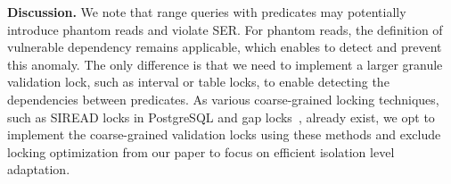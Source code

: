 \noindent\textbf{Discussion.} 
We note that range queries with predicates may potentially introduce phantom reads and violate SER. 
For phantom reads, the definition of vulnerable dependency remains applicable, which enables \sysname to detect and prevent this anomaly. 
The only difference is that we need to implement a larger granule validation lock, such as interval or table locks, to enable detecting the dependencies between predicates. 
As various coarse-grained locking techniques, such as SIREAD locks in PostgreSQL and gap locks~\cite{DBLP:conf/vldb/Lomet93}, already exist, we opt to implement the coarse-grained validation locks using these methods and exclude locking optimization from our paper to focus on efficient isolation level adaptation. 



